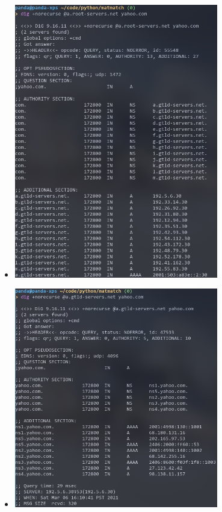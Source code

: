 \documentclass[11pt]{article}
\begin{document}
\begin{enumerate}[label=(\alph*)]
\begin{itemize}
\begin{itemize}
    \item \includegraphics[width=0.7\textwidth]{img/dig-yahoo-1}
    \item \includegraphics[width=0.7\textwidth]{img/dig-yahoo-2}

\end{itemize}
\end{itemize}
\end{enumerate}
\end{document}
